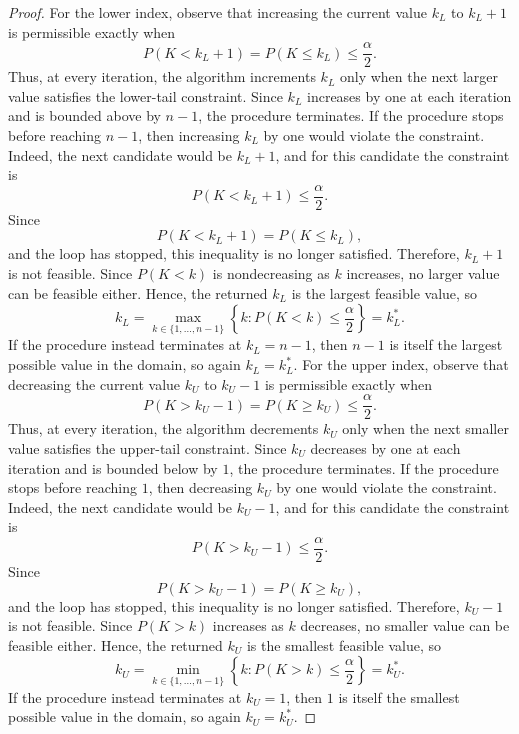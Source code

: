 \documentclass{article}
\begin{document}
\begin{proof}
For the lower index, observe that increasing the current value $k_L$ to $k_L+1$ is permissible exactly when
$$
P(K<k_L+1)=P(K\leq k_L)\leq\frac{\alpha}{2}.
$$
Thus, at every iteration, the algorithm increments $k_L$ only when the next larger value satisfies the lower-tail constraint. Since $k_L$ increases by one at each iteration and is bounded above by $n-1$, the procedure terminates.
If the procedure stops before reaching $n-1$, then increasing $k_L$ by one would violate the constraint. Indeed, the next candidate would be $k_L+1$, and for this candidate the constraint is
$$
P(K<k_L+1)\leq\frac{\alpha}{2}.
$$
Since
$$
P(K<k_L+1)=P(K\leq k_L),
$$
and the loop has stopped, this inequality is no longer satisfied. Therefore, $k_L+1$ is not feasible. Since $P(K<k)$ is nondecreasing as $k$ increases, no larger value can be feasible either. Hence, the returned $k_L$ is the largest feasible value, so
$$
k_L
=
\max_{k\in\{1,\ldots,n-1\}}
\left\{
k:
P(K<k)\leq\frac{\alpha}{2}
\right\}
=
k_L^*.
$$
If the procedure instead terminates at $k_L=n-1$, then $n-1$ is itself the largest possible value in the domain, so again $k_L=k_L^*$.
For the upper index, observe that decreasing the current value $k_U$ to $k_U-1$ is permissible exactly when
$$
P(K>k_U-1)=P(K\geq k_U)\leq\frac{\alpha}{2}.
$$
Thus, at every iteration, the algorithm decrements $k_U$ only when the next smaller value satisfies the upper-tail constraint. Since $k_U$ decreases by one at each iteration and is bounded below by $1$, the procedure terminates.
If the procedure stops before reaching $1$, then decreasing $k_U$ by one would violate the constraint. Indeed, the next candidate would be $k_U-1$, and for this candidate the constraint is
$$
P(K>k_U-1)\leq\frac{\alpha}{2}.
$$
Since
$$
P(K>k_U-1)=P(K\geq k_U),
$$
and the loop has stopped, this inequality is no longer satisfied. Therefore, $k_U-1$ is not feasible. Since $P(K>k)$ increases as $k$ decreases, no smaller value can be feasible either. Hence, the returned $k_U$ is the smallest feasible value, so
$$
k_U
=
\min_{k\in\{1,\ldots,n-1\}}
\left\{
k:
P(K>k)\leq\frac{\alpha}{2}
\right\}
=
k_U^*.
$$
If the procedure instead terminates at $k_U=1$, then $1$ is itself the smallest possible value in the domain, so again $k_U=k_U^*$.
\end{proof}
\end{document}
